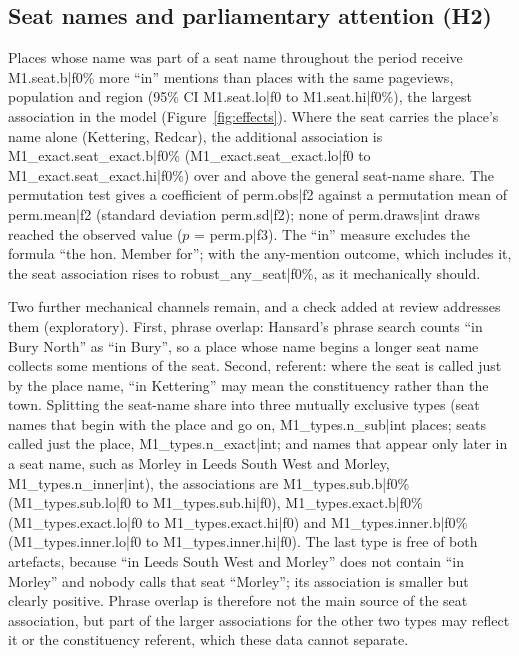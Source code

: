 \documentclass[11pt,a4paper]{article}
\begin{document}
\subsection{Seat names and parliamentary attention (H2)}
Places whose name was part of a seat name throughout the period receive {{M1.seat.b|f0}}\% more ``in'' mentions than places with the same pageviews, population and region (95\% CI {{M1.seat.lo|f0}} to {{M1.seat.hi|f0}}\%), the largest association in the model (Figure~\ref{fig:effects}). Where the seat carries the place's name alone (Kettering, Redcar), the additional association is {{M1_exact.seat_exact.b|f0}}\% ({{M1_exact.seat_exact.lo|f0}} to {{M1_exact.seat_exact.hi|f0}}\%) over and above the general seat-name share. The permutation test gives a coefficient of {{perm.obs|f2}} against a permutation mean of {{perm.mean|f2}} (standard deviation {{perm.sd|f2}}); none of {{perm.draws|int}} draws reached the observed value ($p$ = {{perm.p|f3}}). The ``in'' measure excludes the formula ``the hon. Member for''; with the any-mention outcome, which includes it, the seat association rises to {{robust_any_seat|f0}}\%, as it mechanically should.

Two further mechanical channels remain, and a check added at review addresses them (exploratory). First, phrase overlap: Hansard's phrase search counts ``in Bury North'' as ``in Bury'', so a place whose name begins a longer seat name collects some mentions of the seat. Second, referent: where the seat is called just by the place name, ``in Kettering'' may mean the constituency rather than the town. Splitting the seat-name share into three mutually exclusive types (seat names that begin with the place and go on, {{M1_types.n_sub|int}} places; seats called just the place, {{M1_types.n_exact|int}}; and names that appear only later in a seat name, such as Morley in Leeds South West and Morley, {{M1_types.n_inner|int}}), the associations are {{M1_types.sub.b|f0}}\% ({{M1_types.sub.lo|f0}} to {{M1_types.sub.hi|f0}}), {{M1_types.exact.b|f0}}\% ({{M1_types.exact.lo|f0}} to {{M1_types.exact.hi|f0}}) and {{M1_types.inner.b|f0}}\% ({{M1_types.inner.lo|f0}} to {{M1_types.inner.hi|f0}}). The last type is free of both artefacts, because ``in Leeds South West and Morley'' does not contain ``in Morley'' and nobody calls that seat ``Morley''; its association is smaller but clearly positive. Phrase overlap is therefore not the main source of the seat association, but part of the larger associations for the other two types may reflect it or the constituency referent, which these data cannot separate.
\end{document}
